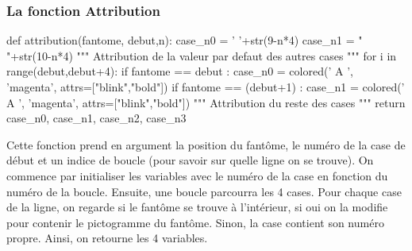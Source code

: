 \documentclass[titlepage]{report}
\begin{document}
\subsubsection{La fonction Attribution}
\begin{python}
def attribution(fantome, debut,n):
    case_n0 = ' '+str(9-n*4) 
    case_n1 = " "+str(10-n*4)
    """ Attribution de la valeur par defaut des autres cases """
    for i in range(debut,debut+4):
        if fantome == debut :
            case_n0 = colored(' A ', 'magenta', attrs=["blink","bold"])   
        if fantome == (debut+1) :
            case_n1 = colored(' A ', 'magenta', attrs=["blink","bold"])   
        """ Attribution du reste des cases """
    return case_n0, case_n1, case_n2, case_n3
\end{python}
\vspace*{0.5cm}
\hspace*{0.5cm}Cette fonction prend en argument la position du fantôme, le numéro de la case de début et un indice de boucle (pour savoir sur quelle ligne on se trouve). On commence par initialiser les variables avec le numéro de la case en fonction du numéro de la boucle. Ensuite, une boucle parcourra les 4 cases. Pour chaque case de la ligne, on regarde si le fantôme se trouve à l'intérieur, si oui on la modifie pour contenir le pictogramme du fantôme. Sinon, la case contient son numéro propre. Ainsi, on retourne les 4 variables.
\end{document}
